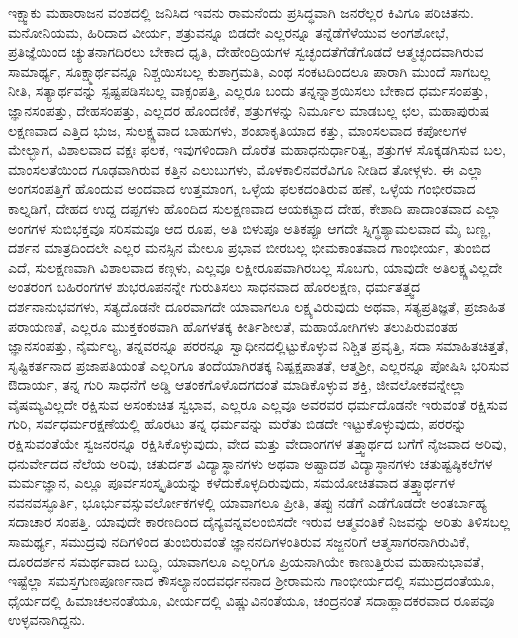 ಇಕ್ಷ್ವಾಕು ಮಹಾರಾಜನ ವಂಶದಲ್ಲಿ ಜನಿಸಿದ ಇವನು ರಾಮನೆಂದು ಪ್ರಸಿದ್ಧವಾಗಿ ಜನರೆಲ್ಲರ ಕಿವಿಗೂ ಪರಿಚಿತನು. ಮನೋನಿಯಮ, ಹಿರಿದಾದ ವೀರ್ಯ, ಶತ್ರುವನ್ನೂ ಬಿಡದೇ ಎಲ್ಲರನ್ನೂ ತನ್ನೆಡೆಗೆಳೆಯುವ ಅಂಗಶೋಭೆ, ಪ್ರತಿಜ್ಞೆಯಿಂದ ಚ್ಯುತನಾಗದಿರಲು ಬೇಕಾದ ಧೃತಿ, ದೇಹೇಂದ್ರಿಯಗಳ ಸ್ವಚ್ಛಂದತೆಗೆಡೆಗೊಡದೆ ಆತ್ಮಚ್ಛಂದವಾಗಿರುವ ಸಾಮಾರ್ಥ್ಯ, ಸೂಕ್ಷ್ಮಾರ್ಥವನ್ನೂ ನಿಶ್ಚಯಿಸಬಲ್ಲ ಕುಶಾಗ್ರಮತಿ, ಎಂಥ ಸಂಕಟದಿಂದಲೂ ಪಾರಾಗಿ ಮುಂದೆ ಸಾಗಬಲ್ಲ ನೀತಿ, ಸತ್ಯಾರ್ಥವನ್ನು ಸ್ಪಷ್ಟಪಡಿಸಬಲ್ಲ ವಾಕ್ಸಂಪತ್ತಿ, ಎಲ್ಲರೂ ಬಂದು ತನ್ನನ್ನಾಶ್ರಯಿಸಲು ಬೇಕಾದ ಧರ್ಮಸಂಪತ್ತು, ಜ್ಞಾನಸಂಪತ್ತು, ದೇಹಸಂಪತ್ತು, ಎಲ್ಲದರ ಹೊಂದಣಿಕೆ, ಶತ್ರುಗಳನ್ನು ನಿರ್ಮೂಲ ಮಾಡಬಲ್ಲ ಛಲ, ಮಹಾಪುರುಷ ಲಕ್ಷಣವಾದ ಎತ್ತಿದ ಭುಜ, ಸುಲಕ್ಷ್ಣವಾದ ಬಾಹುಗಳು, ಶಂಖಾಕೃತಿಯಾದ ಕತ್ತು, ಮಾಂಸಲವಾದ ಕಪೋಲಗಳ ಮೇಲ್ಭಾಗ, ವಿಶಾಲವಾದ ವಕ್ಷಃ ಫಲಕ, ಇವುಗಳಿಂದಾಗಿ ದೊರೆತ ಮಹಾಧನುರ್ಧಾರಿತ್ವ, ಶತ್ರುಗಳ ಸೊಕ್ಕಡಗಿಸುವ ಬಲ, ಮಾಂಸಲತೆಯಿಂದ ಗೂಢವಾಗಿರುವ ಕತ್ತಿನ ಎಲುಬುಗಳು, ಮೊಳಕಾಲಿನವರೆವಿಗೂ ನೀಡಿದ ತೋಳ್ಗಳು. ಈ ಎಲ್ಲಾ ಅಂಗಸಂಪತ್ತಿಗೆ ಹೊಂದುವ ಅಂದವಾದ ಉತ್ತಮಾಂಗ, ಒಳ್ಳೆಯ ಫಲಕದಂತಿರುವ ಹಣೆ, ಒಳ್ಳೆಯ ಗಂಭೀರವಾದ ಕಾಲ್ನಡಿಗೆ, ದೇಹದ ಉದ್ದ ದಪ್ಪಗಳು ಹೊಂದಿದ ಸುಲಕ್ಷಣವಾದ ಆಯಕಟ್ಟಾದ ದೇಹ, ಕೇಶಾದಿ ಪಾದಾಂತವಾದ ಎಲ್ಲಾ ಅಂಗಗಳ ಸುಬಿಭಕ್ತವೂ ಸರಿಸಮವೂ ಆದ ರೂಪ, ಅತಿ ಬಿಳುಪೂ ಅತಿಕಪ್ಪೂ ಆಗದೇ ಸ್ನಿಗ್ಧಶ್ಯಾಮಲವಾದ ಮೈ ಬಣ್ಣ, ದರ್ಶನ ಮಾತ್ರದಿಂದಲೇ ಎಲ್ಲರ ಮನಸ್ಸಿನ ಮೇಲೂ ಪ್ರಭಾವ ಬೀರಬಲ್ಲ ಭೀಮಕಾಂತವಾದ ಗಾಂಭೀರ್ಯ, ತುಂಬಿದ ಎದೆ, ಸುಲಕ್ಷಣವಾಗಿ ವಿಶಾಲವಾದ ಕಣ್ಗಳು, ಎಲ್ಲವೂ ಲಕ್ಷೀರೂಪವಾಗಿರಬಲ್ಲ ಸೊಬಗು, ಯಾವುದೇ ಅತಿಲಕ್ಷ್ಣವಿಲ್ಲದೇ ಅಂತರಂಗ ಬಹಿರಂಗಗಳ ಶುಭರೂಪನನ್ನೇ ಗುರುತಿಸಲು ಸಾಧನವಾದ ಹೊರಲಕ್ಷಣ, ಧರ್ಮತತ್ತ್ವದ ದರ್ಶನಾನುಭವಗಳು, ಸತ್ಯದೊಡನೇ ದೂರವಾಗದೇ ಯಾವಾಗಲೂ ಲಕ್ಷ್ಯವಿರುವುದು ಅಥವಾ, ಸತ್ಯಪ್ರತಿಜ್ಞತೆ, ಪ್ರಜಾಹಿತ ಪರಾಯಣತೆ, ಎಲ್ಲರೂ ಮುಕ್ತಕಂಠವಾಗಿ ಹೊಗಳತಕ್ಕ ಕೀರ್ತಿಶೀಲತೆ, ಮಹಾಯೋಗಿಗಳು ತಲುಪಿರುವಂತಹ ಜ್ಞಾನಸಂಪತ್ತು, ನೈರ್ಮಲ್ಯ, ತನ್ನವರನ್ನೂ ಪರರನ್ನೂ ಸ್ವಾಧೀನದಲ್ಲಿಟ್ಟುಕೊಳ್ಳುವ ನಿಶ್ಚಿತ ಪ್ರವೃತ್ತಿ, ಸದಾ ಸಮಾಹಿತಚಿತ್ತತೆ, ಸೃಷ್ಟಿಕರ್ತನಾದ ಪ್ರಜಾಪತಿಯಂತೆ ಎಲ್ಲರಿಗೂ ತಂದೆಯಾಗಿರತಕ್ಕ ನಿಷ್ಪಕ್ಷಪಾತತೆ, ಆತ್ಮಶ್ರೀ, ಎಲ್ಲರನ್ನೂ ಪೋಷಿಸಿ ಭರಿಸುವ ಔದಾರ್ಯ, ತನ್ನ ಗುರಿ ಸಾಧನೆಗೆ ಅಡ್ಡಿ ಆತಂಕಗೊಳೊದಗದಂತೆ ಮಾಡಿಕೊಳ್ಳುವ ಶಕ್ತಿ, ಜೀವಲೋಕವನ್ನೇಲ್ಲಾ ವೈಷಮ್ಯವಿಲ್ಲದೇ ರಕ್ಷಿಸುವ ಅಸಂಕುಚಿತ ಸ್ವಭಾವ, ಎಲ್ಲರೂ ಎಲ್ಲವೂ ಅವರವರ ಧರ್ಮದೊಡನೇ ಇರುವಂತೆ ರಕ್ಷಿಸುವ ಗುರಿ, ಸರ್ವಧರ್ಮರಕ್ಷಣೆಯಲ್ಲಿ ಹೊರಟು ತನ್ನ ಧರ್ಮವನ್ನು ಮರೆತು ಬಿಡದೇ ಇಟ್ಟುಕೊಳ್ಳುವುದು, ಪರರನ್ನು ರಕ್ಷಿಸುವಂತೆಯೇ ಸ್ವಜನರನ್ನೂ ರಕ್ಷಿಸಿಕೊಳ್ಳುವುದು, ವೇದ ಮತ್ತು ವೇದಾಂಗಗಳ  ತತ್ತ್ವಾರ್ಥದ ಬಗೆಗೆ ನೈಜವಾದ ಅರಿವು, ಧನುರ್ವೇದದ ನೆಲೆಯ ಅರಿವು, ಚತುರ್ದಶ ವಿದ್ಯಾಸ್ಥಾನಗಳು ಅಥವಾ ಅಷ್ಟಾದಶ ವಿದ್ಯಾಸ್ಠಾನಗಳು ಚತುಷ್ಟಷ್ಠಿಕಲೆಗಳ  ಮರ್ಮಜ್ಞಾನ, ಎಲ್ಲೂ ಪೂರ್ವಸಂಸ್ಕೃತಿಯನ್ನು ಕಳೆದುಕೊಳ್ಳದಿರುವುದು, ಸಮಯೋಚಿತವಾದ ತತ್ತ್ವಾರ್ಥಗಳ ನವನವಸ್ಫೂರ್ತಿ, ಭೂರ್ಭುವಸ್ಸುವರ್ಲೋಕಗಳಲ್ಲಿ ಯಾವಾಗಲೂ ಪ್ರೀತಿ, ತಪ್ಪು ನಡೆಗೆ ಎಡೆಗೊಡದೇ ಅಂತರ್ಬಾಹ್ಯ ಸದಾಚಾರ ಸಂಪತ್ತಿ. ಯಾವುದೇ ಕಾರಣದಿಂದ ದೈನ್ಯವನ್ನವಲಂಬಿಸದೇ ಇರುವ ಆತ್ಮವಂತಿಕೆ ನಿಜವನ್ನು ಅರಿತು ತಿಳಿಸಬಲ್ಲ ಸಾಮರ್ಥ್ಯ, ಸಮುದ್ರವು ನದಿಗಳಿಂದ ತುಂಬಿರುವಂತೆ ಜ್ಞಾನನದಿಗಳಂತಿರುವ ಸಜ್ಜನರಿಗೆ ಆತ್ಮಸಾಗರನಾಗಿರುವಿಕೆ, ದೂರದರ್ಶನ ಸಮರ್ಥವಾದ ಬುದ್ಧಿ, ಯಾವಾಗಲೂ ಎಲ್ಲರಿಗೂ ಪ್ರಿಯನಾಗಿಯೇ ಕಾಣುತ್ತಿರುವ ಮಹಾನುಭಾವತೆ, ಇಷ್ಟೆಲ್ಲಾ ಸಮಸ್ತಗುಣಪೂರ್ಣನಾದ ಕೌಸಲ್ಯಾನಂದವರ್ಧನನಾದ ಶ್ರೀರಾಮನು ಗಾಂಭೀರ್ಯದಲ್ಲಿ ಸಮುದ್ರದಂತೆಯೂ, ಧೈರ್ಯದಲ್ಲಿ ಹಿಮಾಚಲನಂತೆಯೂ, ವೀರ್ಯದಲ್ಲಿ ವಿಷ್ಣುವಿನಂತೆಯೂ, ಚಂದ್ರನಂತೆ ಸದಾಹ್ಲಾದಕರವಾದ ರೂಪವೂ ಉಳ್ಳವನಾಗಿದ್ದನು.


